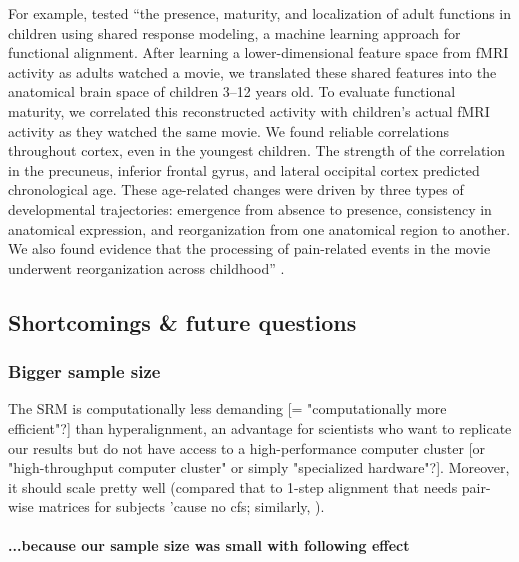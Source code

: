 
%
For example, \citet{yates2021emergence} tested ``the presence, maturity, and
localization of adult functions in children using shared response modeling, a
machine learning approach for functional alignment.
%
After learning a lower-dimensional feature space from fMRI activity as adults
watched a movie, we translated these shared features into the anatomical brain
space of children 3--12 years old.
%
To evaluate functional maturity, we correlated this reconstructed activity with
children’s actual fMRI activity as they watched the same movie. We found
reliable correlations throughout cortex, even in the youngest children.
%
The strength of the correlation in the precuneus, inferior frontal gyrus, and
lateral occipital cortex predicted chronological age.
%
These age-related changes were driven by three types of developmental
trajectories: emergence from absence to presence, consistency in anatomical
expression, and reorganization from one anatomical region to another.
%
We also found evidence that the processing of pain-related events in the movie
underwent reorganization across childhood'' \citep{yates2021emergence}.


\subsection{Shortcomings \& future questions}

\subsubsection{Bigger sample size}
%
The SRM is computationally less demanding [= "computationally more efficient"?]
than hyperalignment, an advantage for scientists who want to replicate our
results but do not have access to a high-performance computer cluster [or
"high-throughput computer cluster" or simply "specialized hardware"?].
%
Moreover, it should scale pretty well (compared that to
\citep{jiahui2020predicting} 1-step alignment that needs pair-wise matrices for
subjects 'cause no \ac{cfs}; similarly, \citep{busch2021hybrid}).


\paragraph{...because our sample size was small with following effect}


